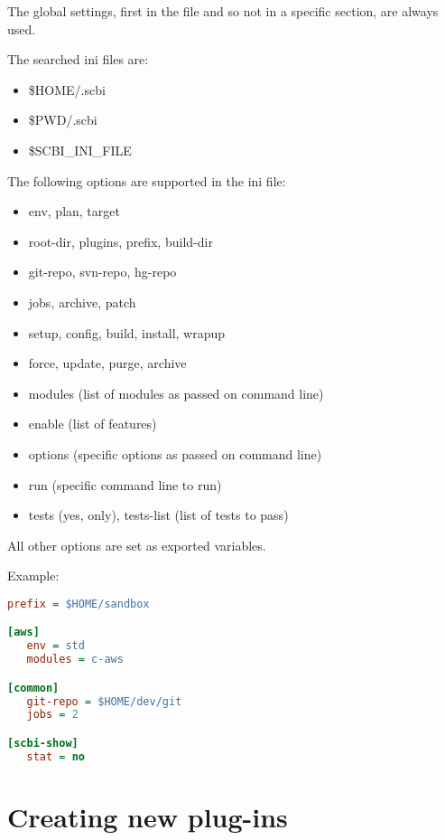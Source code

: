 \documentclass[a4paper,12pt,twoside]{article}
\let\stdsection\section
\renewcommand\section{\newpage\stdsection}
\begin{document}
The global settings, first in the file and so not in a specific section, are always used.

The searched ini files are:

\begin{itemize}
	\item \$HOME/.scbi
	\item \$PWD/.scbi
	\item \$SCBI\_INI\_FILE
\end{itemize}

The following options are supported in the ini file:

\begin{itemize}
	\item env, plan, target
	\item root-dir, plugins, prefix, build-dir
	\item git-repo, svn-repo, hg-repo
	\item jobs, archive, patch
	\item setup, config, build, install, wrapup
	\item force, update, purge, archive
	\item modules (list of modules as passed on command line)
	\item enable (list of features)
	\item options (specific options as passed on command line)
	\item run (specific command line to run)
	\item tests (yes, only), tests-list (list of tests to pass)
\end{itemize}

All other options are set as exported variables.

Example:

\begin{lstlisting}[language={Ini}]
prefix = $HOME/sandbox

[aws]
   env = std
   modules = c-aws

[common]
   git-repo = $HOME/dev/git
   jobs = 2

[scbi-show]
   stat = no
\end{lstlisting}


\section{Creating new plug-ins}
\end{document}
